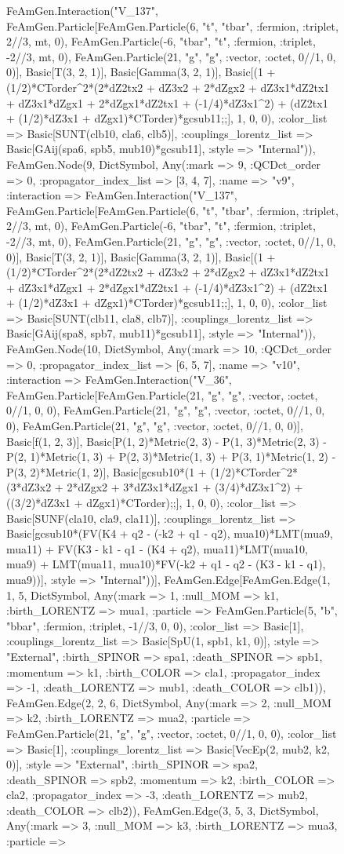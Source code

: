 \documentclass{revtex4}
\begin{document}
\begin{figure}[!htb]
\begin{center}
{FeAmGen.Interaction("V_137", FeAmGen.Particle[FeAmGen.Particle(6, "t", "tbar", :fermion, :triplet, 2//3, mt, 0), FeAmGen.Particle(-6, "tbar", "t", :fermion, :triplet, -2//3, mt, 0), FeAmGen.Particle(21, "g", "g", :vector, :octet, 0//1, 0, 0)], Basic[T(3, 2, 1)], Basic[Gamma(3, 2, 1)], Basic[(1 + (1/2)*CTorder^2*(2*dZ2tx2 + dZ3x2 + 2*dZgx2 + dZ3x1*dZ2tx1 + dZ3x1*dZgx1 + 2*dZgx1*dZ2tx1 + (-1/4)*dZ3x1^2) + (dZ2tx1 + (1/2)*dZ3x1 + dZgx1)*CTorder)*gcsub11;;], 1, 0, 0), :color_list => Basic[SUNT(clb10, cla6, clb5)], :couplings_lorentz_list => Basic[GAij(spa6, spb5, mub10)*gcsub11], :style => "Internal")), FeAmGen.Node(9, Dict{Symbol, Any}(:mark => 9, :QCDct_order => 0, :propagator_index_list => [3, 4, 7], :name => "v9", :interaction => FeAmGen.Interaction("V_137", FeAmGen.Particle[FeAmGen.Particle(6, "t", "tbar", :fermion, :triplet, 2//3, mt, 0), FeAmGen.Particle(-6, "tbar", "t", :fermion, :triplet, -2//3, mt, 0), FeAmGen.Particle(21, "g", "g", :vector, :octet, 0//1, 0, 0)], Basic[T(3, 2, 1)], Basic[Gamma(3, 2, 1)], Basic[(1 + (1/2)*CTorder^2*(2*dZ2tx2 + dZ3x2 + 2*dZgx2 + dZ3x1*dZ2tx1 + dZ3x1*dZgx1 + 2*dZgx1*dZ2tx1 + (-1/4)*dZ3x1^2) + (dZ2tx1 + (1/2)*dZ3x1 + dZgx1)*CTorder)*gcsub11;;], 1, 0, 0), :color_list => Basic[SUNT(clb11, cla8, clb7)], :couplings_lorentz_list => Basic[GAij(spa8, spb7, mub11)*gcsub11], :style => "Internal")), FeAmGen.Node(10, Dict{Symbol, Any}(:mark => 10, :QCDct_order => 0, :propagator_index_list => [6, 5, 7], :name => "v10", :interaction => FeAmGen.Interaction("V_36", FeAmGen.Particle[FeAmGen.Particle(21, "g", "g", :vector, :octet, 0//1, 0, 0), FeAmGen.Particle(21, "g", "g", :vector, :octet, 0//1, 0, 0), FeAmGen.Particle(21, "g", "g", :vector, :octet, 0//1, 0, 0)], Basic[f(1, 2, 3)], Basic[P(1, 2)*Metric(2, 3) - P(1, 3)*Metric(2, 3) - P(2, 1)*Metric(1, 3) + P(2, 3)*Metric(1, 3) + P(3, 1)*Metric(1, 2) - P(3, 2)*Metric(1, 2)], Basic[gcsub10*(1 + (1/2)*CTorder^2*(3*dZ3x2 + 2*dZgx2 + 3*dZ3x1*dZgx1 + (3/4)*dZ3x1^2) + ((3/2)*dZ3x1 + dZgx1)*CTorder);;], 1, 0, 0), :color_list => Basic[SUNF(cla10, cla9, cla11)], :couplings_lorentz_list => Basic[gcsub10*(FV(K4 + q2 - (-k2 + q1 - q2), mua10)*LMT(mua9, mua11) + FV(K3 - k1 - q1 - (K4 + q2), mua11)*LMT(mua10, mua9) + LMT(mua11, mua10)*FV(-k2 + q1 - q2 - (K3 - k1 - q1), mua9))], :style => "Internal"))], FeAmGen.Edge[FeAmGen.Edge(1, 1, 5, Dict{Symbol, Any}(:mark => 1, :null_MOM => k1, :birth_LORENTZ => mua1, :particle => FeAmGen.Particle(5, "b", "bbar", :fermion, :triplet, -1//3, 0, 0), :color_list => Basic[1], :couplings_lorentz_list => Basic[SpU(1, spb1, k1, 0)], :style => "External", :birth_SPINOR => spa1, :death_SPINOR => spb1, :momentum => k1, :birth_COLOR => cla1, :propagator_index => -1, :death_LORENTZ => mub1, :death_COLOR => clb1)), FeAmGen.Edge(2, 2, 6, Dict{Symbol, Any}(:mark => 2, :null_MOM => k2, :birth_LORENTZ => mua2, :particle => FeAmGen.Particle(21, "g", "g", :vector, :octet, 0//1, 0, 0), :color_list => Basic[1], :couplings_lorentz_list => Basic[VecEp(2, mub2, k2, 0)], :style => "External", :birth_SPINOR => spa2, :death_SPINOR => spb2, :momentum => k2, :birth_COLOR => cla2, :propagator_index => -3, :death_LORENTZ => mub2, :death_COLOR => clb2)), FeAmGen.Edge(3, 5, 3, Dict{Symbol, Any}(:mark => 3, :null_MOM => k3, :birth_LORENTZ => mua3, :particle => }
\end{center}
\end{figure}
\end{document}
